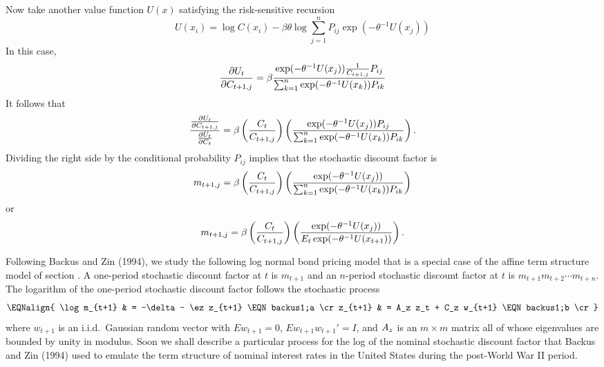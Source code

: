 Now take another value function $U(x)$ satisfying the risk-sensitive recursion
$$ U(x_i) = \log C(x_i) - \beta \theta \log \sum_{j=1}^n P_{ij} \exp\left( - \theta^{-1} U(x_j) \right) $$
In this case,
$$ {\partial U_t \over \partial C_{t+1,j}} = \beta { \exp( - \theta^{-1} U(x_j)) {1 \over C_{t+1,j}} P_{ij} \over \sum_{k=1}^n \exp( - \theta^{-1} U(x_k)) P_{ik}} $$
It follows that
$$ {{\partial U_t \over \partial C_{t+1,j}} \over {\partial U_t \over \partial C_t} }  =
\beta \left( {C_t \over C_{t+1,j}} \right) \left({ \exp( - \theta^{-1} U(x_j))  P_{ij} \over \sum_{k=1}^n \exp( - \theta^{-1} U(x_k))P_{ik}} \right) .$$
Dividing  the right side by the conditional  probability $P_{ij}$ implies that the stochastic discount factor is
$$ m_{t+1,j} = \beta \left({C_t \over C_{t+1,j}} \right) \left( { \exp( - \theta^{-1} U(x_j))  \over \sum_{k=1}^n \exp( - \theta^{-1} U(x_k))P_{ik}} \right)$$
or
$$ m_{t+1,j} = \beta \left( {C_t \over C_{t+1,j}} \right) \left({ \exp( - \theta^{-1} U(x_j))  \over E_t \exp( - \theta^{-1} U(x_{t+1}))} \right). $$

\label{sec:backus}%
Following Backus and Zin (1994), we study the following
 log normal bond pricing model that is a special case of the affine term structure
model of section .
   A one-period stochastic discount  factor
at $t$ is $m_{t+1}$ and an $n$-period stochastic discount factor at $t$ is
$m_{t+1} m_{t+2}  \cdots m_{t+n}$.   The logarithm of
the one-period stochastic discount factor
follows the stochastic process
$$\EQNalign{ \log m_{t+1} & = -\delta - \ez z_{t+1}    \EQN backus1;a \cr
             z_{t+1} & = A_z z_t + C_z  w_{t+1} \EQN backus1;b  \cr}$$
where $w_{t+1}$ is an i.i.d.\ Gaussian random vector with $E
w_{t+1} = 0$, $E w_{t+1} w_{t+1}' = I$, and ${A_z}$ is an $m \times
m$ matrix all of whose eigenvalues are bounded by unity in
modulus. Soon we shall describe a particular  process for the log of the
nominal stochastic discount factor that Backus and Zin (1994) used
to emulate the term structure of nominal interest rates in the
United States
 during the post-World War II period.


